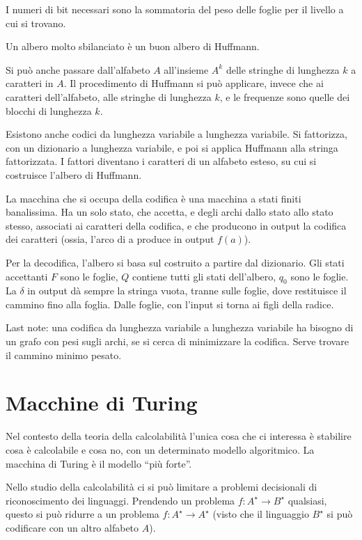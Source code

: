 I numeri di bit necessari sono la sommatoria del peso delle foglie per il livello a cui si trovano.

Un albero molto sbilanciato \`e un buon albero di Huffmann.

Si pu\`o anche passare dall'alfabeto $A$ all'insieme $A^k$ delle stringhe di lunghezza $k$ a caratteri in $A$. Il procedimento di Huffmann si pu\`o applicare, invece che ai caratteri dell'alfabeto, alle stringhe di lunghezza $k$, e le frequenze sono quelle dei blocchi di lunghezza $k$.

Esistono anche codici da lunghezza variabile a lunghezza variabile. Si fattorizza, con un dizionario a lunghezza variabile, e poi si applica Huffmann alla stringa fattorizzata. I fattori diventano i caratteri di un alfabeto esteso, su cui si costruisce l'albero di Huffmann.

La macchina che si occupa della codifica \`e una macchina a stati finiti banalissima. Ha un solo stato, che accetta, e degli archi dallo stato allo stato stesso, associati ai caratteri della codifica, e che producono in output la codifica dei caratteri (ossia, l'arco di a produce in output $f(a)$).

Per la decodifica, l'albero si basa sul  costruito a partire dal dizionario. Gli stati accettanti $F$ sono le foglie, $Q$ contiene tutti gli stati dell'albero, $q_0$ sono le foglie. La $\delta$ in output d\`a sempre la stringa vuota, tranne sulle foglie, dove restituisce il cammino fino alla foglia. Dalle foglie, con l'input si torna ai figli della radice.

Last note: una codifica da lunghezza variabile a lunghezza variabile ha bisogno di un grafo con pesi sugli archi, se si cerca di minimizzare la codifica. Serve trovare il cammino minimo pesato. 

\section{Macchine di Turing}

Nel contesto della teoria della calcolabilit\`a l'unica cosa che ci interessa \`e stabilire cosa \`e calcolabile e cosa no, con un determinato modello algoritmico. La macchina di Turing \`e il modello ``pi\`u forte''.

Nello studio della calcolabilit\`a ci si pu\`o limitare a problemi decisionali di riconoscimento dei linguaggi. Prendendo un problema $f : A^{\star} \to B^{\star}$ qualsiasi, questo si pu\`o ridurre a un problema $f : A^{\star} \to A^{\star}$ (visto che il linguaggio $B^{\star}$ si pu\`o codificare con un altro alfabeto $A$).

